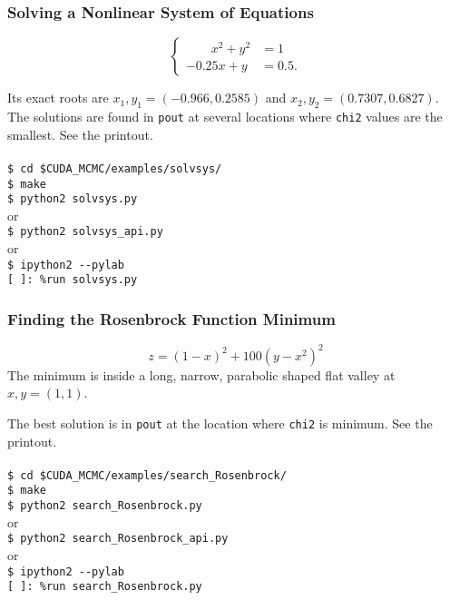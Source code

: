 \documentclass[preprint2]{aastex}
\begin{document}
\subsubsection{Solving a Nonlinear System of Equations}

\begin{equation}
  \begin{cases}
    \qquad x^2 + y^2 &= 1 \\
    -0.25x + y &= 0.5.
  \end{cases}
\end{equation}

Its exact roots are $x_1,y_1 = (-0.966, 0.2585)$ and $x_2,y_2 = (0.7307, 0.6827)$.
The solutions are found in \verb|pout| at several locations where \verb|chi2| values 
are the smallest. See the printout. \\\\
\verb|$ cd $CUDA_MCMC/examples/solvsys/| \\
\verb|$ make| \\
\verb|$ python2 solvsys.py| \\
or \\
\verb|$ python2 solvsys_api.py| \\
or \\
\verb|$ ipython2 --pylab| \\
\verb|[ ]: %run solvsys.py| \\


\subsubsection{Finding the Rosenbrock Function Minimum}

\begin{equation}
  z = (1 - x)^2 + 100(y - x^2)^2
\end{equation}
The minimum is inside a long, narrow, parabolic shaped flat valley at $x,y = (1,1)$.

The best solution is in \verb|pout| at the location where \verb|chi2| is minimum. See the printout. \\\\
\verb|$ cd $CUDA_MCMC/examples/search_Rosenbrock/| \\
\verb|$ make| \\
\verb|$ python2 search_Rosenbrock.py| \\
or \\
\verb|$ python2 search_Rosenbrock_api.py| \\
or \\
\verb|$ ipython2 --pylab| \\
\verb|[ ]: %run search_Rosenbrock.py| \\
\end{document}

